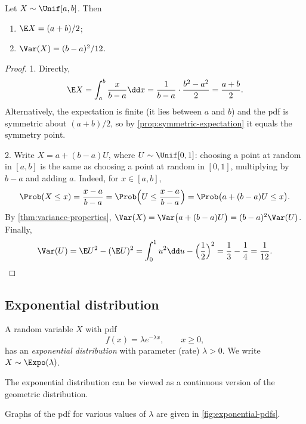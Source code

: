\begin{theorem}\label{thm:uniform-properties}
Let $X \sim \Unif[a, b]$. Then
\begin{enumerate}
  \item $\E X = (a + b)/2$;
  \item $\Var(X) = (b - a)^2/12$.
\end{enumerate}
\end{theorem}

\begin{proof}
1. Directly,
\[
  \E X = \int_a^b \frac{x}{b - a} \dd x = \frac{1}{b-a} \cdot \frac{b^2 - a^2}{2} = \frac{a + b}{2}.
\]
Alternatively, the expectation is finite (it lies between $a$ and $b$) and the pdf is symmetric about $(a+b)/2$, so by \cref{prop:symmetric-expectation} it equals the symmetry point.

2. Write $X = a + (b - a)U$, where $U \sim \Unif[0, 1]$: choosing a point at random in $[a, b]$ is the same as choosing a point at random in $[0, 1]$, multiplying by $b - a$ and adding $a$. Indeed, for $x \in [a, b]$,
\[
  \Prob(X \le x) = \frac{x - a}{b - a} = \Prob\Bigl(U \le \frac{x - a}{b - a}\Bigr) = \Prob\bigl(a + (b-a)U \le x\bigr).
\]
By \cref{thm:variance-properties}, $\Var(X) = \Var\bigl(a + (b-a)U\bigr) = (b-a)^2 \Var(U)$. Finally,
\[
  \Var(U) = \E U^2 - (\E U)^2 = \int_0^1 u^2 \dd u - \Bigl(\frac12\Bigr)^2 = \frac13 - \frac14 = \frac{1}{12}. \qedhere
\]
\end{proof}

\subsection{Exponential distribution}\label{sec:exponential}

\begin{definition}\label{def:exponential}
A random variable $X$ with pdf
\[
  f(x) = \lambda e^{-\lambda x}, \qquad x \ge 0,
\]
has an \emph{exponential distribution} with parameter (rate) $\lambda > 0$. We write $X \sim \Expo(\lambda)$.
\end{definition}

The exponential distribution can be viewed as a continuous version of the geometric distribution.

Graphs of the pdf for various values of $\lambda$ are given in \cref{fig:exponential-pdfs}.

